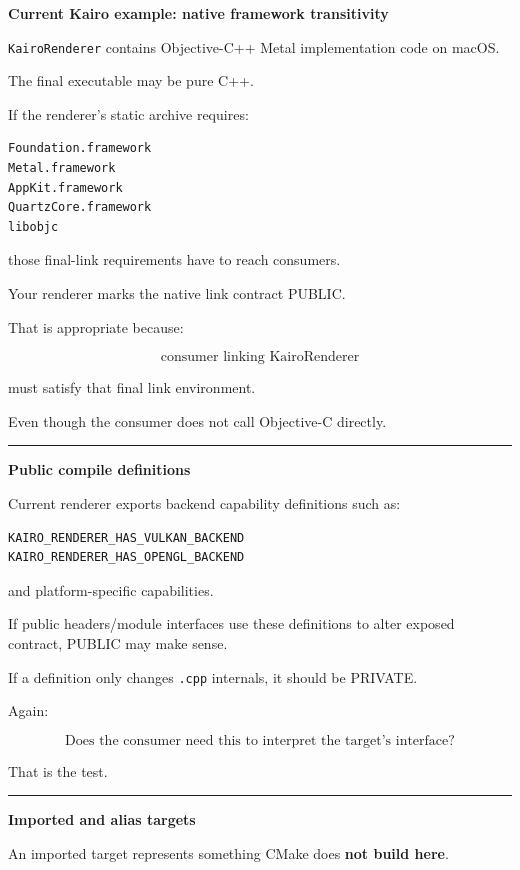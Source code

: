 \textbf{Current Kairo example: native framework transitivity}

\texttt{KairoRenderer} contains Objective-C++ Metal implementation code on macOS.

The final executable may be pure C++.

If the renderer's static archive requires:

\begin{verbatim}
Foundation.framework
Metal.framework
AppKit.framework
QuartzCore.framework
libobjc
\end{verbatim}

those final-link requirements have to reach consumers.

Your renderer marks the native link contract PUBLIC.

That is appropriate because:

\[
\text{consumer linking KairoRenderer}
\]

must satisfy that final link environment.

Even though the consumer does not call Objective-C directly.

\begin{center}\rule{0.5\linewidth}{0.5pt}\end{center}

\textbf{Public compile definitions}

Current renderer exports backend capability definitions such as:

\begin{verbatim}
KAIRO_RENDERER_HAS_VULKAN_BACKEND
KAIRO_RENDERER_HAS_OPENGL_BACKEND
\end{verbatim}

and platform-specific capabilities.

If public headers/module interfaces use these definitions to alter exposed contract, PUBLIC may make sense.

If a definition only changes \texttt{.cpp} internals, it should be PRIVATE.

Again:

\[
\text{Does the consumer need this to interpret the target's interface?}
\]

That is the test.

\begin{center}\rule{0.5\linewidth}{0.5pt}\end{center}

\textbf{Imported and alias targets}

An imported target represents something CMake does \textbf{not build here}.


